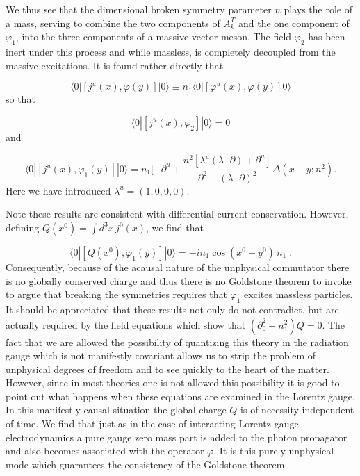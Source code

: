 \documentclass[%
  12pt,
  paper=letter,
  abstracton,
  pagesize=auto,
  version=last,
  DIV=calc
  ]{scrartcl}
\begin{document}
We thus see that the dimensional broken symmetry parameter $n$ plays
the role of a mass, serving to combine the two components of $A^T_k$
and the one component of $\varphi_1$, into the three components of a
massive vector meson.  The field $\varphi_2$ has been inert under this
process and while massless, is completely decoupled from the massive
excitations.  It is found rather directly that

\begin{equation}
\langle 0|[j^u(x), \varphi(y)]|0\rangle \equiv n_1\langle 0|[\varphi^u(x), \varphi(y)] 0\rangle
\end{equation}
so that

\begin{equation}
\langle 0|[j^u(x), \varphi_2]|0\rangle = 0
\end{equation}
and

\begin{equation}
\langle 0|[j^u(x), \varphi_1(y)]|0\rangle = n_1[-\partial^u+\frac{n^2[\lambda^u(\lambda\cdot\partial)+\partial^u]}{\partial^2+(\lambda\cdot\partial)^2}\Delta(x-y; n^2).
\end{equation}
Here we have introduced $\lambda^u=(1,0,0,0)$.

Note these results are consistent with differential current
conservation.  However, defining $Q(x^0)=\int d^3x\, j^0(x)$, we find
that

\[\langle 0|[Q(x^0), \varphi_1(y)]|0\rangle =-i n_1\cos(x^0-y^0)\,n_1 \;.\]
Consequently, because of the acausal nature of the
unphysical commutator there is no globally conserved charge and thus
there is no Goldstone theorem to invoke to argue that breaking the
symmetries requires that $\varphi_1$ excites massless particles.  It
should be appreciated that these results not only do not contradict,
but are actually required by the field equations which show that
$(\partial^2_0+n^2_1)Q=0$.  The fact that we are allowed the possibility
of quantizing this theory in the radiation gauge which is not
manifestly covariant allows us to strip the problem of unphysical
degrees of freedom and to see quickly to the heart of the matter.
However, since in most theories one is not allowed this possibility it
is good to point out what happens when these equations are examined in
the Lorentz gauge.  In this manifestly causal situation the global
charge $Q$ is of necessity independent of time.  We find that just as
in the case of interacting Lorentz gauge electrodynamics a pure gauge
zero mass part is added to the photon propagator and also becomes
associated with the operator $\varphi$.  It is this purely unphysical
mode which guarantees the consistency of the Goldstone theorem.
\end{document}
